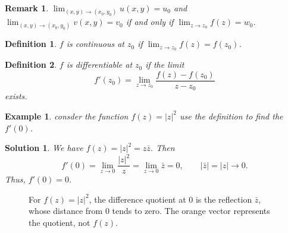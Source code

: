 \documentclass{report}
\newtheorem{definition}{Definition}
\newtheorem{remark}{Remark}
\newtheorem{example}{Example}
\newtheorem{solution}{Solution}
\begin{document}
\begin{remark}
    $\lim_{(x,y) \to (x_0,y_0)}u(x,y)=u_0$ and $\lim_{(x,y) \to (x_0,y_0)}v(x,y)=v_0$ if and only if $\lim_{z \to z_0}f(z)=w_0$.
\end{remark}


\begin{definition}
    
    $f$ is continuous at $z_0$ if $\lim_{z \to z_0}f(z)=f(z_0)$.
\end{definition}

\begin{definition}
    
    $f$ is differentiable at $z_0$ if the limit 
    \[
        f'(z_0) = \lim_{z \to z_0} \frac{f(z) - f(z_0)}{z - z_0}
    \]
    exists.
\end{definition}


\begin{example}
    consder the function $f(z) = |z|^2$ use the definition to find the $f'(0)$.
\end{example}


\begin{solution}

    We have $f(z) = |z|^2 = z\bar{z}$. Then 
    \[
        f'(0)=\lim_{z\to0}\frac{|z|^2}{z}
        =\lim_{z\to0}\bar z=0,
        \qquad |\bar z|=|z|\longrightarrow0.
    \]
    Thus, $f'(0) = 0$.
\end{solution}

\begin{figure}[H]
    \centering
    \caption{For $f(z)=|z|^2$, the difference quotient at $0$ is the reflection $\bar z$, whose distance from $0$ tends to zero. The orange vector represents the quotient, not $f(z)$.}
    \label{fig:modulus-derivative}
\end{figure}
\end{document}
